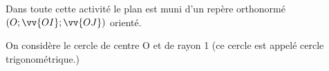 \documentclass[12pt,a4paper]{article}  %
\begin{document}
	\graphicspath{{./images/}}
	
	\begin{center}
		
		
	\end{center}

Dans toute cette activité le plan est muni d'un repère orthonormé $(O;\vv{OI};\vv{OJ})$ orienté.

On considère le cercle de centre $\mathrm{O}$ et de rayon 1 (ce cercle est appelé cercle trigonométrique.)
\end{document}
